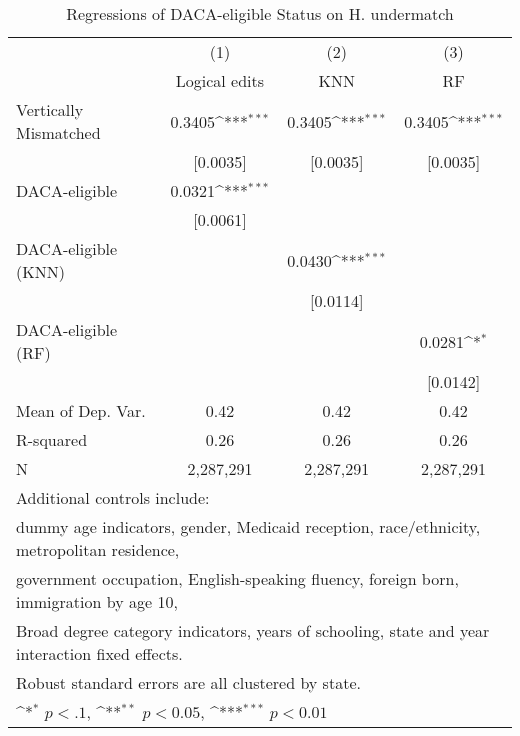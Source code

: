 \begin{table}[htbp]\centering
\def\sym#1{\ifmmode^{#1}\else\(^{#1}\)\fi}
\caption{Regressions of DACA-eligible Status on H. undermatch}
\begin{tabular}{l*{3}{c}}
\toprule
                    &\multicolumn{1}{c}{(1)}         &\multicolumn{1}{c}{(2)}         &\multicolumn{1}{c}{(3)}         \\
                    &Logical edits         &         KNN         &          RF         \\
\midrule
Vertically Mismatched&      0.3405\sym{***}&      0.3405\sym{***}&      0.3405\sym{***}\\
                    &    [0.0035]         &    [0.0035]         &    [0.0035]         \\
\addlinespace
DACA-eligible       &      0.0321\sym{***}&                     &                     \\
                    &    [0.0061]         &                     &                     \\
\addlinespace
DACA-eligible (KNN) &                     &      0.0430\sym{***}&                     \\
                    &                     &    [0.0114]         &                     \\
\addlinespace
DACA-eligible (RF)  &                     &                     &      0.0281\sym{*}  \\
                    &                     &                     &    [0.0142]         \\
\midrule
Mean of Dep. Var.   &        0.42         &        0.42         &        0.42         \\
R-squared           &        0.26         &        0.26         &        0.26         \\
N                   &   2,287,291         &   2,287,291         &   2,287,291         \\
\bottomrule
\multicolumn{4}{l}{\footnotesize Additional controls include:}\\
\multicolumn{4}{l}{\footnotesize dummy age indicators, gender, Medicaid reception, race/ethnicity, metropolitan residence,}\\
\multicolumn{4}{l}{\footnotesize government occupation, English-speaking fluency, foreign born, immigration by age 10,}\\
\multicolumn{4}{l}{\footnotesize Broad degree category indicators, years of schooling, state and year interaction fixed effects.}\\
\multicolumn{4}{l}{\footnotesize Robust standard errors are all clustered by state.}\\
\multicolumn{4}{l}{\footnotesize \sym{*} \(p<.1\), \sym{**} \(p<0.05\), \sym{***} \(p<0.01\)}\\
\end{tabular}
\end{table}
